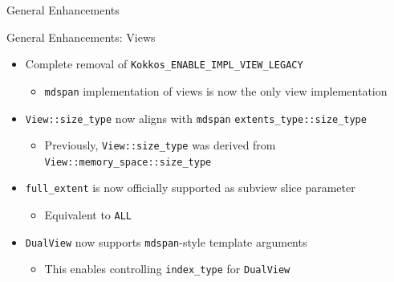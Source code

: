 
\begin{frame}[fragile]

  {\Huge General Enhancements}

  \vspace{10pt}

\end{frame}


\begin{frame}[fragile]{General Enhancements: Views}
  \begin{itemize}
    \item Complete removal of \texttt{Kokkos\_ENABLE\_IMPL\_VIEW\_LEGACY}
    \begin{itemize}
      \item[] \texttt{mdspan} implementation of views is now the only view implementation 
    \end{itemize}
    \vfill
    \item \texttt{View::size\_type} now aligns with \texttt{mdspan} \texttt{extents\_type::size\_type}
    \begin{itemize}
      \item[] Previously, \texttt{View::size\_type} was derived from \texttt{View::memory\_space::size\_type}
    \end{itemize}
    \vfill
    \item \texttt{full\_extent} is now officially supported as subview slice parameter
    \begin{itemize}
      \item[] Equivalent to \texttt{ALL}
    \end{itemize}
    \vfill
    \item \texttt{DualView} now supports \texttt{mdspan}-style template arguments
    \begin{itemize}
      \item[] This enables controlling \texttt{index\_type} for \texttt{DualView}
    \end{itemize}
  \end{itemize}
\end{frame}

